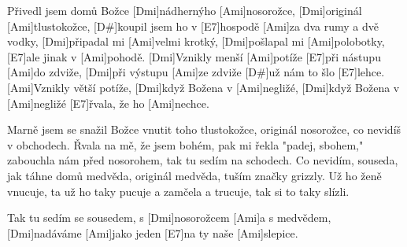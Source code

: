 
\sloka
[Ami]Přivedl jsem domů Božce [Dmi]nádhernýho [Ami]nosorožce,
[Dmi]originál [Ami]tlustokožce, [D#\dim]koupil jsem ho v [E7]hospodě
[Ami]za dva rumy a dvě vodky, [Dmi]připadal mi [Ami]velmi krotký,
[Dmi]pošlapal mi [Ami]polobotky, [E7]ale jinak v [Ami]pohodě.
[Dmi]Vznikly menší [Ami]potíže [E7]při nástupu [Ami]do zdviže,
[Dmi]při výstupu [Ami]ze zdviže [D#\dim]už nám to šlo [E7]lehce.
[Ami]Vznikly větší potíže, [Dmi]když Božena v [Ami]negližé,
[Dmi]když Božena v [Ami]negližé [E7]řvala, že ho [Ami]nechce.

\sloka
Marně jsem se snažil Božce vnutit toho tlustokožce,
originál nosorožce, co nevidíš v obchodech.
Řvala na mě, že jsem bohém, pak mi řekla "padej, sbohem,"
zabouchla nám před nosorohem, tak tu sedím na schodech.
Co nevidím, souseda, jak táhne domů medvěda,
originál medvěda, tuším značky grizzly.
Už ho ženě vnucuje, ta už ho taky pucuje
a zamčela a trucuje, tak si to taky slízli.

\hvezda
[Ami]Tak tu sedím se sousedem, s [Dmi]nosorožcem [Ami]a s medvědem,
[Dmi]nadáváme [Ami]jako jeden [E7]na ty naše [Ami]slepice.
